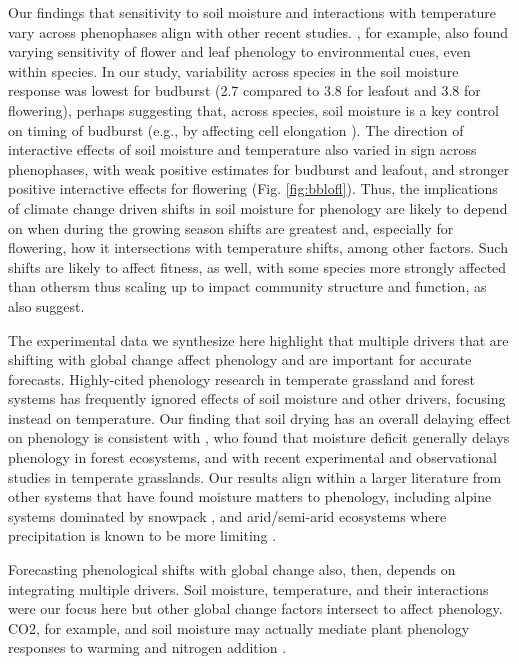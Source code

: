 \documentclass{article}
\begin{document}
\par Our findings that sensitivity to soil moisture and interactions with temperature vary across phenophases align with other recent studies. \citep{buonaiuto2021differences}, for example, also found varying sensitivity of flower and leaf phenology to environmental cues, even within species. In our study, variability across species in the soil moisture response was lowest for budburst (2.7 compared to 3.8 for leafout and  3.8 for flowering), perhaps suggesting that, across species, soil moisture is a key control on timing of budburst (e.g., by affecting cell elongation \citep{essiamah1986}). The direction of interactive effects of soil moisture and temperature also varied in sign across phenophases, with weak positive estimates for budburst and leafout, and stronger positive interactive effects for flowering (Fig. \ref{fig:bblofl}). Thus, the implications of climate change driven shifts in soil moisture for phenology are likely to depend on when during the growing season shifts are greatest and, especially for flowering, how it intersections with temperature shifts, among other factors. Such shifts are likely to affect fitness, as well, with some species more strongly affected than othersm thus scaling up to impact community structure and function, as \citep{buonaiuto2021differences} also suggest.

\par The experimental data we synthesize here highlight that multiple drivers that are shifting with global change affect phenology and are important for accurate forecasts. Highly-cited phenology research in temperate grassland and forest systems has frequently ignored effects of soil moisture and other drivers, focusing instead on temperature. Our finding that soil drying has an overall delaying effect on phenology is consistent with \citet{seyed2018}, who found that moisture deficit generally delays phenology in forest ecosystems, and with recent experimental \citep{liu2022} and observational \citep{tao2020} studies in temperate grasslands. Our results align within a larger literature from other systems that have found moisture matters to phenology, including alpine systems dominated by snowpack \citep[e.g.,][]{dunne2004,sherwood2017}, and arid/semi-arid ecosystems where precipitation is known to be more limiting \citep{tao2019}. 
\par Forecasting phenological shifts with global change also, then, depends on integrating multiple drivers. Soil moisture, temperature, and their interactions were our focus here but other global change factors intersect to affect phenology. CO2, for example, and soil moisture may actually mediate plant phenology responses to warming and nitrogen addition \citep{liu2022}.
\end{document}
